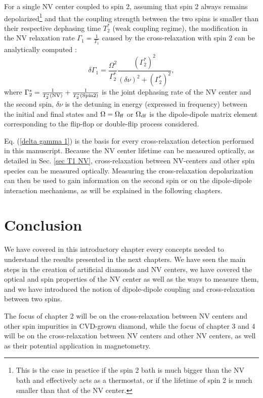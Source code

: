 \documentclass[a4paper, 11pt]{book}
\begin{document}
For a single NV center coupled to spin 2, assuming that spin 2 always remains depolarized\footnote{This is the case in practice if the spin 2 bath is much bigger than the NV bath and effectively acts as a thermostat, or if the lifetime of spin 2 is much smaller than that of the NV center.} and that the coupling strength between the two spins is smaller than their respective dephasing time $T_2^*$ (weak coupling regime), the modification in the NV relaxation rate $\Gamma_1=\frac{1}{T_1}$ caused by the cross-relaxation with spin 2 can be analytically computed \citep{hall2016detection}:
\begin{equation}
\delta \Gamma_1=\frac{\Omega^2}{\Gamma_2^*} \frac{(\Gamma_2^*)^2}{(\delta \nu)^2+(\Gamma_2^*)^2},
\label{delta gamma 1}
\end{equation}
where $\Gamma_2^*=\frac{1}{T_2^*(\rm NV)}+\frac{1}{T_2^*(\rm Spin 2)}$ is the joint dephasing rate of the NV center and the second spin, $\delta \nu$ is the detuning in energy (expressed in frequency) between the initial and final states and $\Omega=\Omega_{\rm ff}$ or $\Omega_{\rm df}$ is the dipole-dipole matrix element corresponding to the flip-flop or double-flip process considered. 

Eq. (\ref{delta gamma 1}) is the basis for every cross-relaxation detection performed in this manuscript. Because the NV center lifetime can be measured optically, as detailed in Sec. \ref{sec T1 NV}, cross-relaxation between NV-centers and other spin species can be measured optically. Measuring the cross-relaxation depolarization can then be used to gain information on the second spin or on the dipole-dipole interaction mechanisms, as will be explained in the following chapters.

\section{Conclusion}

We have covered in this introductory chapter every concepts needed to understand the results presented in the next chapters. We have seen the main steps in the creation of artificial diamonds and NV centers, we have covered the optical and spin properties of the NV center as well as the ways to measure them, and we have introduced the notion of dipole-dipole coupling and cross-relaxation between two spins.

The focus of chapter 2 will be on the cross-relaxation between NV centers and other spin impurities in CVD-grown diamond, while the focus of chapter 3 and 4 will be on the cross-relaxation between NV centers and other NV centers, as well as their potential application in magnetometry.
\end{document}
